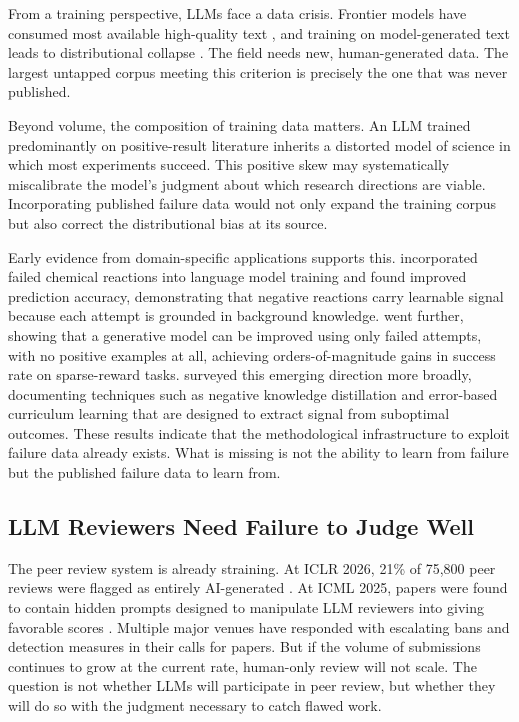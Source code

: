 From a training perspective, LLMs face a data crisis. Frontier
models have consumed most available high-quality text
\citep{villalobos2024run}, and training on model-generated text
leads to distributional collapse \citep{shumailov2024curse}. The
field needs new, human-generated data. The largest untapped corpus
meeting this criterion is precisely the one that was never
published.

Beyond volume, the composition of training data matters. An LLM
trained predominantly on positive-result literature inherits a
distorted model of science in which most experiments succeed. This
positive skew may systematically miscalibrate the model's judgment
about which research directions are viable. Incorporating published
failure data would not only expand the training corpus but also
correct the distributional bias at its source.

Early evidence from domain-specific applications supports this.
\citet{toniato2025negative} incorporated failed chemical reactions
into language model training and found improved prediction accuracy,
demonstrating that negative reactions carry learnable signal because
each attempt is grounded in background knowledge.
\citet{lee2025banel} went further, showing that a generative model
can be improved using only failed attempts, with no positive
examples at all, achieving orders-of-magnitude gains in success
rate on sparse-reward tasks. \citet{naser2025failure} surveyed this
emerging direction more broadly, documenting techniques such as
negative knowledge distillation and error-based curriculum learning
that are designed to extract signal from suboptimal outcomes. These
results indicate that the methodological infrastructure to exploit
failure data already exists. What is missing is not the ability to
learn from failure but the published failure data to learn from.

\subsection{LLM Reviewers Need Failure to Judge Well}

The peer review system is already straining. At ICLR 2026, 21\% of
75,800 peer reviews were flagged as entirely AI-generated
\citep{pangram2025iclr}. At ICML 2025, papers were found to
contain hidden prompts designed to manipulate LLM reviewers into
giving favorable scores \citep{theocharopoulos2025prompt}. Multiple
major venues have responded with escalating bans and detection
measures in their calls for papers. But if the volume of
submissions continues to grow at the current rate, human-only
review will not scale. The question is not whether LLMs will
participate in peer review, but whether they will do so with the
judgment necessary to catch flawed work.

